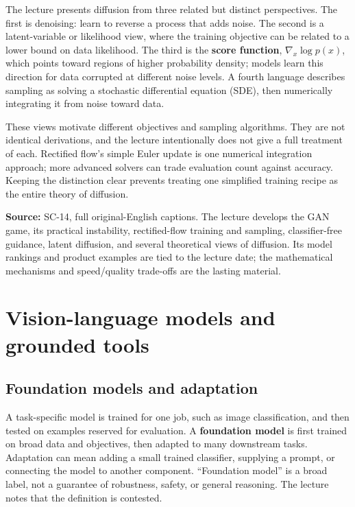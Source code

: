 \hypertarget{04-visual-computing-ii-ch031-diffusion-has-several-mathematical-views}{}

The lecture presents diffusion from three related but distinct perspectives. The first is denoising: learn to reverse a process that adds noise. The second is a latent-variable or likelihood view, where the training objective can be related to a lower bound on data likelihood. The third is the \textbf{score function}, \(\nabla_x\log p(x)\), which points toward regions of higher probability density; models learn this direction for data corrupted at different noise levels. A fourth language describes sampling as solving a stochastic differential equation (SDE), then numerically integrating it from noise toward data.

These views motivate different objectives and sampling algorithms. They are not identical derivations, and the lecture intentionally does not give a full treatment of each. Rectified flow's simple Euler update is one numerical integration approach; more advanced solvers can trade evaluation count against accuracy. Keeping the distinction clear prevents treating one simplified training recipe as the entire theory of diffusion.

\textbf{Source:} SC-14, full original-English captions. The lecture develops the GAN game, its practical instability, rectified-flow training and sampling, classifier-free guidance, latent diffusion, and several theoretical views of diffusion. Its model rankings and product examples are tied to the lecture date; the mathematical mechanisms and speed/quality trade-offs are the lasting material.

\section{Vision-language models and grounded tools}\label{04-visual-computing-ii-ch031-vision-language-models-and-grounded-tools}

\hypertarget{04-visual-computing-ii-ch031-vision-language-models-and-grounded-tools}{}

\subsection{Foundation models and adaptation}\label{04-visual-computing-ii-ch031-foundation-models-and-adaptation}

\hypertarget{04-visual-computing-ii-ch031-foundation-models-and-adaptation}{}

A task-specific model is trained for one job, such as image classification, and then tested on examples reserved for evaluation. A \textbf{foundation model} is first trained on broad data and objectives, then adapted to many downstream tasks. Adaptation can mean adding a small trained classifier, supplying a prompt, or connecting the model to another component. ``Foundation model'' is a broad label, not a guarantee of robustness, safety, or general reasoning. The lecture notes that the definition is contested.

